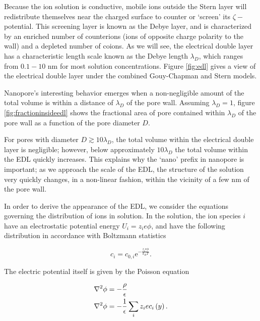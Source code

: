 			Because the ion solution is conductive, mobile ions outside the Stern layer will redistribute themselves near the charged surface to counter or `screen' its $\zeta-$potential. This screening layer is known as the Debye layer, and is characterized by an enriched number of counterions (ions of opposite charge polarity to the wall) and a depleted number of coions. As we will see, the electrical double layer has a characteristic length scale known as the Debye length $\lambda_{D}$, which ranges from $0.1-10$ nm for most solution concentrations. Figure \ref{fig:edl} gives a view of the electrical double layer under the combined Gouy-Chapman and Stern models. 


			Nanopore's interesting behavior emerges when a non-negligible amount of the total volume is within a distance of $\lambda_{D}$ of the pore wall. Assuming $\lambda_{D}=1$, figure \ref{fig:fractioninsideedl} shows the fractional area of pore contained within $\lambda_{D}$ of the pore wall as a function of the pore diameter $D$. 
			
			
			
			For pores with diameter $D\gtrsim10\lambda_{D}$, the total volume within the electrical double layer is negligible; however, below approximately $10\lambda_{D}$ the total volume within the EDL quickly increases. This explains why the `nano' prefix in nanopore is important; as we approach the scale of the EDL, the structure of the solution very quickly changes, in a non-linear fashion, within the vicinity of a few nm of the pore wall.
			
			
			
			In order to derive the appearance of the EDL, we consider the equations governing the distribution of ions in solution. In the solution, the ion species $i$ have an electrostatic potential energy $U_{i}=z_{i}e\phi$, and have the following distribution in accordance with Boltzmann statistics
			
			
			
			\begin{equation} \label{eq:boltzmann}
				c_{i}=c_{0,i}\mathrm{e}^{-\frac{z_{i}e\phi}{k_{B}T}}.				
			\end{equation}
			
			The electric potential itself is given by the Poisson equation
			
			\begin{equation} \label{eq:poisson}
				\begin{split}
					\mathbf{\nabla}^{2}\phi & = -\frac{\rho}{\epsilon} \\
					\mathbf{\nabla}^{2}\phi & = -\frac{1}{\epsilon}\sum_{i}z_{i}ec_{i}\left(y\right).
				\end{split}
			\end{equation}
			
